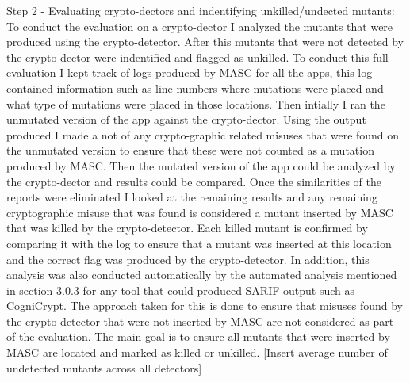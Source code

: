Step 2 - Evaluating crypto-dectors and indentifying unkilled/undected mutants: To conduct the evaluation on a crypto-dector I analyzed the mutants that were produced using the crypto-detector. After this mutants that were not detected by the crypto-dector were indentified and flagged as unkilled. To conduct this full evaluation I kept track of logs produced by MASC for all the apps, this log contained information such as line numbers where mutations were placed and what type of mutations were placed in those locations. Then intially I ran the unmutated version of the app against the crypto-dector. Using the output produced I made a not of any crypto-graphic related misuses that were found on the unmutated version to ensure that these were not counted as a mutation produced by MASC. Then the mutated version of the app could be analyzed by the crypto-dector and results could be compared. Once the similarities of the reports were eliminated I looked at the remaining results and any remaining cryptographic misuse that was found is considered a mutant inserted by MASC that was killed by the crypto-detector. Each killed mutant is confirmed by comparing it with the log to ensure that a mutant was inserted at this location and the correct flag was produced by the crypto-detector. In addition, this analysis was also conducted automatically by the automated analysis mentioned in section 3.0.3 for any tool that could produced SARIF output such as CogniCrypt. The approach taken for this is done to ensure that misuses found by the crypto-detector that were not inserted by MASC are not considered as part of the evaluation. The main goal is to ensure all mutants that were inserted by MASC are located and marked as killed or unkilled. [Insert average number of undetected mutants across all detectors]

